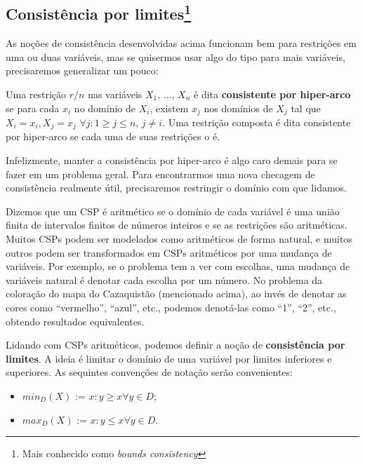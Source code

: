 \documentclass{article}
\begin{document}
\subsection{Consistência por limites\footnote{Mais conhecido como \textit{bounds consistency}}}

As noções de consistência desenvolvidas acima funcionam bem para restrições em uma ou duas variáveis,
mas se quisermos usar algo do tipo para mais variáveis, precisaremos generalizar um pouco:

\begin{definition}
  Uma restrição $r/n$ nas variáveis $X_1$, ..., $X_n$ é dita \textbf{consistente por hiper-arco}
  se para cada $x_i$ no domínio de $X_i$, existem $x_j$ nos domínios de $X_j$ tal que
  $X_i = x_i, X_j = x_j$  $\forall j: 1 \geq j \leq n$, $j \neq i$.
  Uma restrição composta é dita consistente por hiper-arco se cada uma de suas restrições o é.
\end{definition}

Infelizmente, manter a consistência por hiper-arco é algo caro demais para se fazer em um problema geral. Para
encontrarmos uma nova checagem de consistência realmente útil, precisaremos restringir o domínio com que lidamos.

Dizemos que um CSP é aritmético se o domínio de cada variável é uma união
finita de intervalos finitos de números inteiros e se as restrições são aritméticas. Muitos CSPs podem ser modelados como aritméticos de forma natural, e muitos outros podem ser transformados em CSPs aritméticos por uma mudança de variáveis.
Por exemplo, se o problema tem a ver com escolhas, uma mudança de variáveis natural é denotar cada escolha por um número. No problema da
coloração do mapa do Cazaquistão (mencionado acima), ao invés de denotar as cores como ``vermelho'', ``azul'', etc., podemos denotá-las como ``1'', ``2'', etc., obtendo resultados equivalentes.

Lidando com CSPs aritméticos, podemos definir a noção de \textbf{consistência por limites}. A ideia é limitar o domínio
de uma variável por limites inferiores e superiores. As sequintes convenções de notação serão convenientes:

\begin{itemize}
  \item $min_D(X)$ := $x: y \geq x \forall y \in D$;
  \item $max_D(X)$ := $x: y \leq x \forall y \in D$.
\end{itemize}
\end{document}
